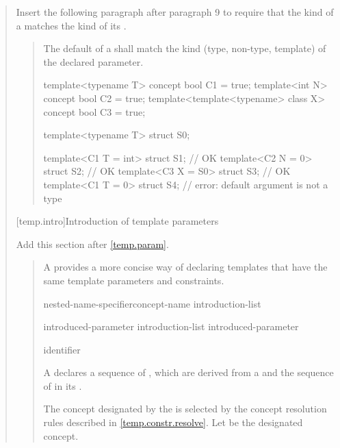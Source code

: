 \begin{quote}
\begin{quote}
\end{quote}

Insert the following paragraph after paragraph 9 to require that the
kind of a  matches the kind of its
.

\begin{quote}
\setcounter{Paras}{11}
\pnum
The default  of
a  shall match
the kind (type, non-type, template) of the declared parameter.
% 
\enterexample
\begin{codeblock}
template<typename T> concept bool C1 = true;
template<int N> concept bool C2 = true;
template<template<typename> class X> concept bool C3 = true;

template<typename T> struct S0;

template<C1 T = int> struct S1; // OK
template<C2 N = 0> struct S2;   // OK
template<C3 X = S0> struct S3;  // OK
template<C1 T = 0> struct S4;   // error: default argument is not a type
\end{codeblock}
\exitexample
\end{quote}


[temp.intro]{Introduction of template parameters}

Add this section after \ref{temp.param}.

\begin{quote}

\pnum
A  provides a more concise way of declaring
templates that have the same template parameters and constraints.

\begin{bnf}
\br
  nested-name-specifier\opt concept-name \terminal{\{} introduction-list \terminal{\}}

\br
  introduced-parameter\br
  introduction-list \terminal{,} introduced-parameter

\br
    \opt identifier
\end{bnf}

A  declares a sequence of 
, which are derived from a 
 and the sequence of  
in its .

\pnum
The concept designated by the  is selected by the
concept resolution rules described in \ref{temp.constr.resolve}. Let
 be the designated concept.


\end{quote}
\end{quote}
